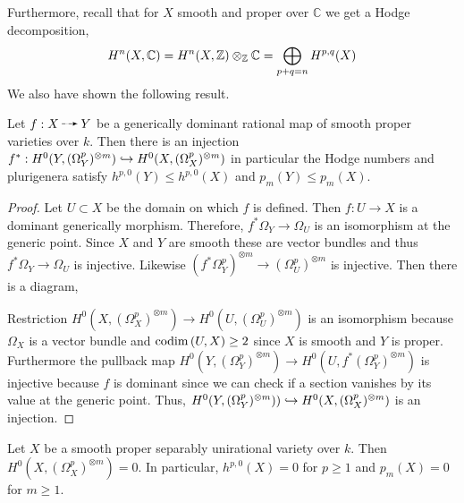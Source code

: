\documentclass[12pt]{article}
\renewcommand{\C}{\mathbb{C}}
\begin{document}
\begin{rmk}
Furthermore, recall that for $X$ smooth and proper over $\mathbb{C}$ we get a Hodge decomposition,
\[ H^n(X, \C) = H^n(X, \Z) \otimes_{\Z} \C = \bigoplus_{p + q = n} H^{p,q}(X) \]
We also have shown the following result.
\end{rmk}

\begin{lemma}
Let $f : X \rat Y$ be a generically \etale dominant rational map of smooth proper varieties over $k$. Then there is an injection $f^* : H^0(Y, (\Omega_Y^p)^{\otimes m}) \hookrightarrow H^0(X, (\Omega_X^p)^{\otimes m})$ in particular the Hodge numbers and plurigenera satisfy $h^{p,0}(Y) \le h^{p,0}(X)$ and $p_m(Y) \le p_m(X)$.
\end{lemma}

\begin{proof}
Let $U \subset X$ be the domain on which $f$ is defined. Then $f : U \to X$ is a dominant generically \etale morphism. Therefore, $f^* \Omega_Y \to \Omega_U$ is an isomorphism at the generic point. Since $X$ and $Y$ are smooth these are vector bundles and thus $f^* \Omega_Y \to \Omega_U$ is injective. Likewise $(f^* \Omega_Y^p)^{\otimes m} \to (\Omega_U^p)^{\otimes m}$ is injective. Then there is a diagram,
\begin{center}
\end{center}
Restriction $H^0(X, (\Omega_X^p)^{\otimes m}) \to H^0(U, (\Omega_U^p)^{\otimes m})$ is an isomorphism because $\Omega_X$ is a vector bundle and $\mathrm{codim}\left( U, X \right) \ge 2$ since $X$ is smooth and $Y$ is proper. Furthermore the pullback map $H^0(Y, (\Omega_Y^p)^{\otimes m}) \to H^0(U, f^* (\Omega_Y^p)^{\otimes m})$ is injective because $f$ is dominant since we can check if a section vanishes by its value at the generic point. Thus, $H^0(Y, (\Omega_Y^p)^{\otimes m})) \hookrightarrow H^0(X, (\Omega_X^p)^{\otimes m})$ is an injection.
\end{proof}

\begin{cor}
Let $X$ be a smooth proper separably unirational variety over $k$. Then $H^0(X, (\Omega^p_X)^{\otimes m}) = 0$. In particular, $h^{p, 0}(X) = 0$ for $p \ge 1$ and $p_m(X) = 0$ for $m \ge 1$.
\end{cor}
\end{document}
